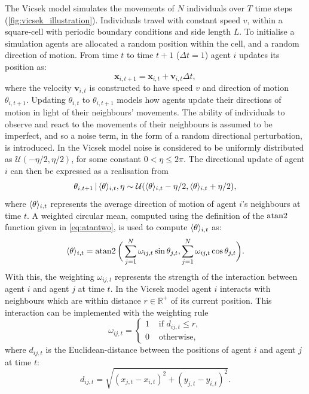 The Vicsek model simulates the movements of $N$ individuals over $T$ time steps
(\cref{fig:vicsek_illustration}). Individuals travel with constant speed $v$,
within a square-cell with periodic boundary conditions and side length $L$. To
initialise a simulation agents are allocated a random position within the cell,
and a random direction of motion. From time $t$ to time $t+1$ ($\Delta t = 1$)
agent $i$ updates its position as:
\begin{equation}
  \label{eq:positional_update}
  \bm{x}_{i, t+1} = \bm{x}_{i, t} + \bm{v}_{i, t}\Delta t,
\end{equation}
where the velocity $\bm{v}_{i,t}$ is constructed to have speed $v$ and
direction of motion $\theta_{i, t+1}$. Updating $\theta_{i,t}$ to $\theta_{i,
t+1}$ models how agents update their directions of motion in light of their
neighbours' movements. The ability of individuals to observe and react to the
movements of their neighbours is assumed to be imperfect, and so a noise term,
in the form of a random directional perturbation, is introduced. In the Vicsek
model noise is considered to be uniformly distributed as $\mathcal{U}(-\eta/2,
\eta/2)$, for some constant $0 < \eta \leq 2\pi$. The directional update of
agent $i$ can then be expressed as a realisation from
\begin{equation}
  \label{eq:vicsek_update}
  \theta_{i, t+1} \,|\, \langle\theta\rangle_{i, t}, \eta \sim
                 \mathcal{U}(\langle\theta\rangle_{i, t} - \eta/2,
                             \langle\theta\rangle_{i, t} + \eta/2),
\end{equation}
where $\langle\theta\rangle_{i, t}$ represents the average direction of motion of
agent $i$'s neighbours at time $t$. A weighted circular mean, computed using
the definition of the $\operatorname{atan2}$ function given in \cref{eq:atantwo}, is used
to compute $\langle\theta\rangle_{i, t}$ as:
\begin{equation}
  \label{eq:weighted_interaction}
  \langle\theta\rangle_{i, t} = \operatorname{atan2}\bigg(
      \sum_{j=1}^N \omega_{ij, t} \sin\theta_{j,t},
      \sum_{j=1}^N \omega_{ij, t} \cos\theta_{j,t}
  \bigg).
\end{equation}
With this, the weighting $\omega_{ij, t}$ represents the strength of the
interaction between agent $i$ and agent $j$ at time $t$. In the Vicsek model
agent $i$ interacts with neighbours which are within distance
$r\in\mathbb{R}^+$ of its current position. This interaction can be implemented
with the weighting rule
\begin{equation}
  \label{eq:vicsek_interaction}
  \omega_{ij,t} =
  \begin{cases}
    1 & \text{ if } d_{ij, t} \leq r,\\
    0 & \text{ otherwise,}
  \end{cases}
\end{equation}
where $d_{ij,t}$ is the Euclidean-distance between the positions of agent $i$
and agent $j$ at time $t$:
\begin{equation*}
  d_{ij,t} = \sqrt{(x_{j,t} - x_{i,t})^2 + (y_{j,t} - y_{i,t})^2}.
\end{equation*}

